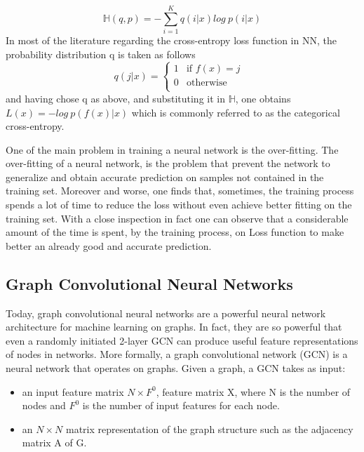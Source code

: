 \documentclass{report}
\begin{document}
\[
\mathbb{H}(q,p) = - \sum_{i=1}^{K} q(i|x) log\ p(i|x) 
\]
In most of the literature regarding the cross-entropy loss function in NN, the
probability distribution q is taken as follows
\begin{equation}
q(j|x)= 
\begin{cases}
1 & \text{if $f(x)=j$ }\\
0 &\text{otherwise}\\
\end{cases}
\end{equation}
and having chose q as above, and substituting it in $\mathbb{H}$, one obtains \\ $L(x)=-log\ p(f(x)|x)$  which
is commonly referred to as the categorical cross-entropy.

One of the main problem in training a neural network is the over-fitting. The
over-fitting of a neural network, is the problem that prevent the network to generalize
and obtain accurate prediction on samples not contained in the training set. Moreover and worse, one finds that, sometimes, the training process spends a
lot of time to reduce the loss without even achieve better fitting on the training
set. With a close inspection in fact one can observe that a considerable amount
of the time is spent, by the training process, on Loss function to make better an already good and accurate prediction.

\subsection{Graph Convolutional Neural Networks}
Today, graph convolutional neural networks are a powerful neural network architecture for machine learning on graphs. In fact, they are so powerful that even a randomly initiated 2-layer GCN can produce useful feature representations of nodes in networks. 
More formally, a graph convolutional network (GCN) is a neural network that operates on graphs. Given a graph, a GCN takes as input:
\begin{itemize}
\item an input feature matrix $N \times F^0$, feature matrix X, where N is the number of nodes and $F^0$ is the number of input features for each node.
\item an $N \times N$ matrix representation of the graph structure such as the adjacency matrix A of G.

\end{itemize}
\end{document}
